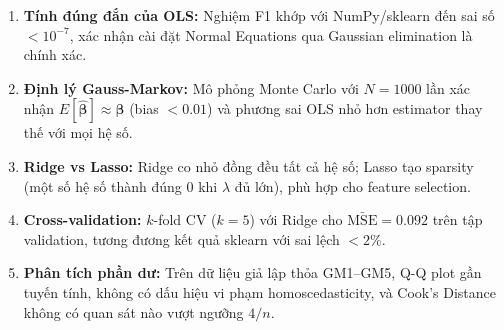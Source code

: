 \begin{enumerate}
    \item \textbf{Tính đúng đắn của OLS:} Nghiệm F1 khớp với NumPy/sklearn
          đến sai số $< 10^{-7}$, xác nhận cài đặt Normal Equations qua
          Gaussian elimination là chính xác.

    \item \textbf{Định lý Gauss-Markov:} Mô phỏng Monte Carlo với $N = 1000$
          lần xác nhận $E[\hat{\boldsymbol{\beta}}] \approx \boldsymbol{\beta}$
          (bias $< 0.01$) và phương sai OLS nhỏ hơn estimator thay thế
          với mọi hệ số.

    \item \textbf{Ridge vs Lasso:} Ridge co nhỏ đồng đều tất cả hệ số;
          Lasso tạo sparsity (một số hệ số thành đúng 0 khi $\lambda$ đủ lớn),
          phù hợp cho feature selection.

    \item \textbf{Cross-validation:} $k$-fold CV ($k=5$) với Ridge cho
          $\bar{\mathrm{MSE}} = 0.092$ trên tập validation,
          tương đương kết quả sklearn với sai lệch $< 2\%$.

    \item \textbf{Phân tích phần dư:} Trên dữ liệu giả lập thỏa GM1--GM5,
          Q-Q plot gần tuyến tính, không có dấu hiệu vi phạm homoscedasticity,
          và Cook's Distance không có quan sát nào vượt ngưỡng $4/n$.
\end{enumerate}
